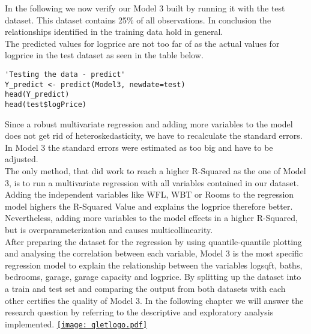 In the following we now verify our Model 3 built by running it with the test dataset. This dataset contains 25\% of all observations. In conclusion the relationships identified in the training data hold in general. 
\\

The predicted values for logprice are not too far of as the actual values for logprice in the test dataset as seen in the table below. \\

\begin{lstlisting}[frame = single,backgroundcolor=\color{hellgelb}]
'Testing the data - predict'
Y_predict <- predict(Model3, newdate=test)
head(Y_predict)
head(test$logPrice)
\end{lstlisting}

Since a robust multivariate regression and adding more variables to the model does not get rid of heteroskedasticity, we have to recalculate the standard errors. In Model 3 the standard errors were estimated as too big and have to be adjusted. \\
The only method, that did work to reach a higher R-Squared as the one of Model 3, is to run a multivariate regression with all variables contained in our dataset. Adding the independent variables like WFL, WBT or Rooms to the regression model highers the R-Squared Value and explains the logprice therefore better. Nevertheless, adding more variables to the model  effects in a higher R-Squared, but is overparameterization and causes multicollinearity.  \\


After preparing the dataset for the regression by using quantile-quantile plotting and analysing the correlation between each variable, Model 3 is the most specific regression model to explain the relationship between the variables logsqft, baths, bedrooms, garage, garage capacity  and logprice. By splitting up the dataset into a train and test set and comparing the output from both datasets with each other certifies the quality of Model 3. In the following chapter we will answer the research question by referring to the descriptive and exploratory analysis implemented. \href{https://github.com/arminecseri/SPL-SOSE-17/blob/master/regressions.R}{\texttt{[image: qletlogo.pdf]}}\\

